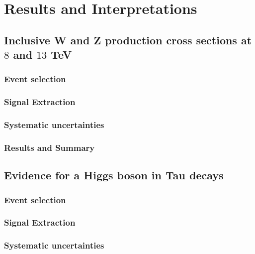 \chapter{Results and Interpretations}

\section{Inclusive W and Z production cross sections at $8$ and $13$ TeV}

\subsection{Event selection}

\subsection{Signal Extraction}

\subsection{Systematic uncertainties}

\subsection{Results and Summary}

\section{Evidence for a Higgs boson in Tau decays}

\subsection{Event selection}

\subsection{Signal Extraction}

\subsection{Systematic uncertainties}

